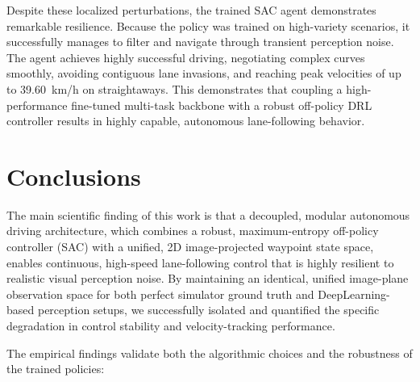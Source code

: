 \documentclass[sn-mathphys,Numbered]{sn-jnl}
\begin{document}
Despite these localized perturbations, the trained SAC agent demonstrates remarkable resilience. Because the policy was trained on high-variety scenarios, it successfully manages to filter and navigate through transient perception noise. The agent achieves highly successful driving, negotiating complex curves smoothly, avoiding contiguous lane invasions, and reaching peak velocities of up to \SI{39.60}{km/h} on straightaways. This demonstrates that coupling a high-performance fine-tuned multi-task backbone with a robust off-policy DRL controller results in highly capable, autonomous lane-following behavior.

\section{Conclusions}
\label{sec:conclusions}

The main scientific finding of this work is that a decoupled, modular autonomous driving architecture, which combines a robust, maximum-entropy off-policy controller (SAC) with a unified, 2D image-projected waypoint state space, enables continuous, high-speed lane-following control that is highly resilient to realistic visual perception noise. By maintaining an identical, unified image-plane observation space for both perfect simulator ground truth and DeepLearning-based perception setups, we successfully isolated and quantified the specific degradation in control stability and velocity-tracking performance.

The empirical findings validate both the algorithmic choices and the robustness of the trained policies:
\end{document}
